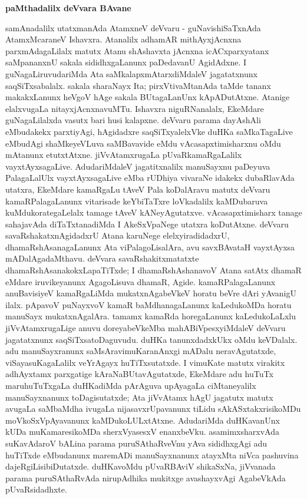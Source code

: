\bigskip
\begin{center}
{\Large\bf paMthadalilx deVvara BAvane}
\end{center}

samAnadalilx utatxmanAda AtamxneV deVvaru - guNavishiSaTxnAda AtamxMcaraneV Ishavxra. Atanalilx adhamAR mithAyxjAcnxna parxmAdagaLilalx matutx Atanu shAshavxta jAcnxna icACxparxyatanx saMpananxnU sakala sididhxgaLanunx paDedavanU AgidAdxne. I guNagaLiruvudariMda Ata saMkalapxmAtarxdiMdaleV jagatatxnunx saqSiTxsabalalx. sakala sharaNayx Ita; pirxVtivaMtanAda taMde tananx makakxLanunx heVgoV hAge sakala BUtagaLanUnx kApADutAtxne. Atanige elalxvugaLa nitayxjAcnxnavuMTu. Ishavxra niguRNanalalx, EkeMdare guNagaLilalxda vasutx bari husi kalapxne. deVvaru parama dayAshAli eMbudakekx parxtiyAgi, hAgidadxre saqSiTxyalelxVke duHKa saMkaTagaLive eMbudAgi shaMkeyeVLuva saMBavavide eMdu vAcasapxtimisharxnu oMdu mAtanunx etutxtAtxne. jiVvAtamxrugaLa pUvaRkamaRgaLalilx vayxtAyxsagaLive. AdudariMdaleV jagatitxnalilx manuSayxnu paDeyuva PalagaLalUlx vayxtAyxsagaLive eMba rUDhiya vivaraNe idakekx dubaRlavAda utatxra, EkeMdare kamaRgaLu tAveV Pala koDalAravu matutx deVvaru kamaRPalagaLanunx vitarisade keYbiTaTxre loVkadalilx kaMDubaruva kuMdukorategaLelalx tamage tAveV kANeyAgutatxve. vAcasapxtimisharx tanage sahajavAda diTaTxtanadiMda I AkeSxVpaNege utatxra koDutAtxne. deVvaru savaRshakatxnAgidadxrU Atana karuNege elelxyiradidadxrU, dhamaRshAsanagaLanunx Ata viPalagoLisalAra, avu savxBAvataH vayxtAyxsa mADalAgadaMthavu. deVvara savaRshakitxmatatxte dhamaRshAsanakokxLapaTiTxde; I dhamaRshAshanavoV Atana satAtx dhamaR eMdare iruvikeyanunx AgagoLisuva dhamaR, Agide. kamaRPalagaLanunx anuBavisiyeV kamaRgaLiMda mukatxnAgabeVkeV horatu beVre dAri yAvanigU ilalx. pApavoV puNayxvoV kamaR baMdhanagaLanunx kaLedukoMDa horatu manuSayx mukatxnAgalAra. tamamx kamaRda horegaLanunx kaLedukoLaLxlu jiVvAtamxrugaLige anuvu doreyabeVkeMba mahABiVpesxyiMdaleV deVvaru jagatatxnunx saqSiTxsatoDaguvudu. duHKa tanunxdadxkUkx oMdu keVDalalx. adu manuSayxranunx saMsAravimuKaranAnxgi mADalu neravAgutatxde, viSayasuKagaLalilx veYrAgayx huTiTxsutatxde. I vimuKate matutx virakitx adhAyxtamx parxgatige kAraNaBUtavAgutatxde, EkeMdare adu huTuTx maruhuTuTxgaLa duHKadiMda pArAguva upAyagaLa ciMtaneyalilx manuSayxnanunx toDagisutatxde; Ata jiVvAtamx hAgU jagatutx matutx avugaLa saMbaMdha ivugaLa nijasavxrUpavanunx tiLidu sAkASxtakxrisikoMDu moVkoSxVpAyavanunx kaMDukoLULxtAtxne. AdudariMda duHKavanUnx kUDa muKamaresikoMDa sherxVyasesxV enanxbeVku. asamimxsharxvAda suKavAdaroV bALina parama puruSAthaRveVnu yAva sididhxgAgi adu huTiTxde eMbudanunx maremADi manuSayxnanunx atayxMta niVca pashuvina dajeRgiLisibiDutatxde. duHKavoMdu pUvaRBAviV shikaSxNa, jiVvanada parama puruSAthaRvAda nirupAdhika mukitxge avashayxvAgi AgabeVkAda pUvaRsidadhxte.

